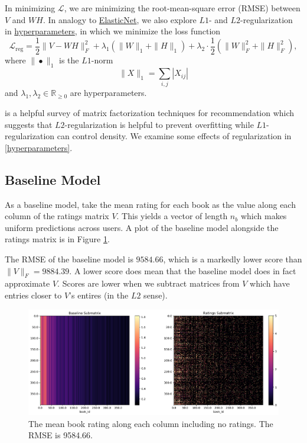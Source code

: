 \documentclass[11pt]{article}
\begin{document}
In minimizing \(\mathcal{L}\), we are minimizing the root-mean-square
error (RMSE) between \(V\) and \(WH\). In analogy to
\href{https://scikit-learn.org/stable/modules/linear_model.html\#elastic-net}{ElasticNet},
we also explore \(L1\)- and \(L2\)-regularization in
\href{}{hyperparameters}, in which we minimize the loss function 
\begin{equation} \label{eq:reg-loss-fcn}
\mathcal{L}_{\text{reg}} = \frac{1}{2} \| V - WH \|_F^2 + \lambda_1 (\|W\|_1 + \|H\|_1) + \lambda_2 \cdot \frac{1}{2} (\|W\|_F^2 + \|H\|_F^2),
\end{equation} where \(\| \bullet \|_1\) is the \(L1\)-norm \[
\| X \|_1 = \sum_{i, j} |X_{ij}|
\] and \(\lambda_1, \lambda_2 \in \mathbb{R}_{\geq 0}\) are
hyperparameters.

\cite{ramlatchanSurveyMatrixCompletion2018} is a helpful survey of matrix factorization techniques for recommendation which suggests that $L2$-regularization is helpful to prevent overfitting while $L1$-regularization can control density. We examine some effects of regularization in \ref{hyperparameters}.


    

    \hypertarget{baseline-model}{%
\subsection{Baseline Model}\label{baseline-model}}

    As a baseline model, take the mean rating for each book as the value along each column of the
ratings matrix $V$. This yields a vector of length $n_b$ which makes uniform predictions across users.
A plot of the baseline model alongside the ratings matrix is in Figure \ref{fig:baseline-matrix}.

The RMSE of the baseline model is $9584.66$, which is a markedly lower score than $\|V\|_F = 9884.39$.
A lower score does mean that the baseline model does in fact approximate $V$.
Scores are lower when we subtract matrices from $V$ which have entries closer to $V$'s entires (in the $L2$ sense).


\begin{figure}[t]
    \includegraphics[width=\linewidth]{../image/goodreads-models/baseline-matrix.png}
    \caption[Baseline matrix]{The mean book rating along each column including no ratings. The RMSE is 9584.66.}
     \label{fig:baseline-matrix}
\end{figure}
\end{document}
